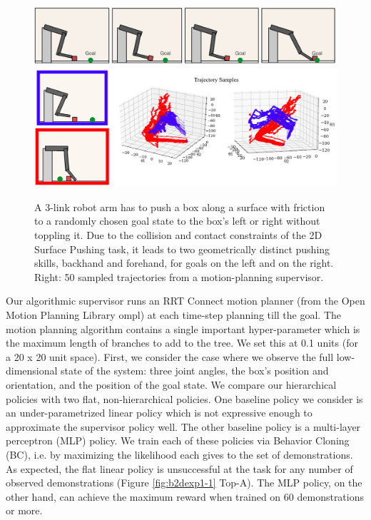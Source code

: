 \begin{figure}[ht!]
    \centering
    \includegraphics[width=\textwidth]{ddco-experiments/2d-sp-friction.png}
    \includegraphics[width=\textwidth]{ddco-experiments/c-space.png}
    \caption{A 3-link robot arm has to push a box along a surface with friction to a randomly chosen goal state to the box's left or right without toppling it. Due to the collision and contact constraints of the 2D Surface Pushing task, it leads to two geometrically distinct pushing skills, backhand and forehand, for goals on the left and on the right. Right: 50 sampled trajectories from a motion-planning supervisor. \label{fig:b2dcspace}}
\end{figure}

Our algorithmic supervisor runs an RRT Connect motion planner (from the Open Motion Planning Library \textsf{ompl}) at each time-step planning till the goal. The motion planning algorithm contains a single important hyper-parameter which is the maximum length of branches to add to the tree. We set this at 0.1 units (for a 20 x 20 unit space). First, we consider the case where we observe the full low-dimensional state of the system: three joint angles, the box's position and orientation, and the position of the goal state. 
We compare our hierarchical policies with two flat, non-hierarchical policies. One baseline policy we consider is an under-parametrized linear policy which is not expressive enough to approximate the supervisor policy well. The other baseline policy is a multi-layer perceptron (MLP) policy.
We train each of these policies via Behavior Cloning (BC), i.e. by maximizing the likelihood each gives to the set of demonstrations.
As expected, the flat linear policy is unsuccessful at the task for any number of observed demonstrations (Figure \ref{fig:b2dexp1-1} Top-A). The MLP policy, on the other hand, can achieve the maximum reward when trained on 60 demonstrations or more. 

